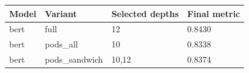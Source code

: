 \begin{tabular}{llll}
\hline
Model & Variant & Selected depths & Final metric \\
\hline
bert & full & 12 & 0.8430 \\
bert & pods\_all & 10 & 0.8338 \\
bert & pods\_sandwich & 10,12 & 0.8374 \\
\hline
\end{tabular}

